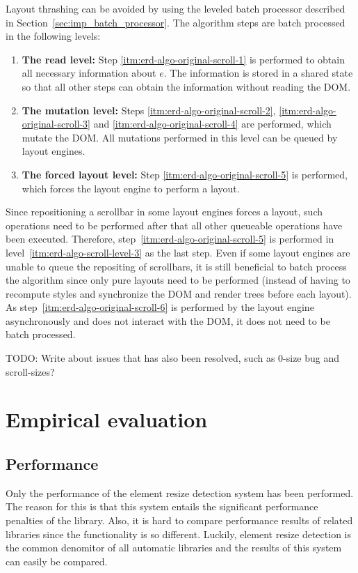 \documentclass{acm_proc_article-sp}
\newcommand{\gls}[1]{#1}
\begin{document}
    Layout thrashing can be avoided by using the leveled batch processor described in Section~\ref{sec:imp_batch_processor}.
    The algorithm steps are batch processed in the following levels:
    \begin{enumerate}
      \item\label{itm:erd-algo-scroll-level-1}
        \textbf{The read level:}
        Step \ref{itm:erd-algo-original-scroll-1} is performed to obtain all necessary information about $e$.
        The information is stored in a shared state so that all other steps can obtain the information without reading the \gls{DOM}.
      \item\label{itm:erd-algo-scroll-level-2}
        \textbf{The mutation level:}
        Steps \ref{itm:erd-algo-original-scroll-2}, \ref{itm:erd-algo-original-scroll-3} and \ref{itm:erd-algo-original-scroll-4} are performed, which mutate the \gls{DOM}.
        All mutations performed in this level can be queued by layout engines.
      \item\label{itm:erd-algo-scroll-level-3}
        \textbf{The forced layout level:}
        Step \ref{itm:erd-algo-original-scroll-5} is performed, which forces the \gls{layout engine} to perform a layout.
    \end{enumerate}

    Since repositioning a scrollbar in some layout engines forces a layout, such operations need to be performed after that all other queueable operations have been executed.
    Therefore, step~\ref{itm:erd-algo-original-scroll-5} is performed in level~\ref{itm:erd-algo-scroll-level-3} as the last step.
    Even if some layout engines are unable to queue the repositing of scrollbars, it is still beneficial to batch process the algorithm since only pure layouts need to be performed (instead of having to recompute styles and synchronize the \gls{DOM} and render trees before each layout).
    As step~\ref{itm:erd-algo-original-scroll-6} is performed by the \gls{layout engine} asynchronously and does not interact with the \gls{DOM}, it does not need to be batch processed.

    TODO: Write about issues that has also been resolved, such as 0-size bug and scroll-sizes?

\section{Empirical evaluation}
  \subsection{Performance}
    Only the performance of the element resize detection system has been performed.
    The reason for this is that this system entails the significant performance penalties of the library.
    Also, it is hard to compare performance results of related libraries since the functionality is so different.
    Luckily, element resize detection is the common denomitor of all automatic libraries and the results of this system can easily be compared.
\end{document}
